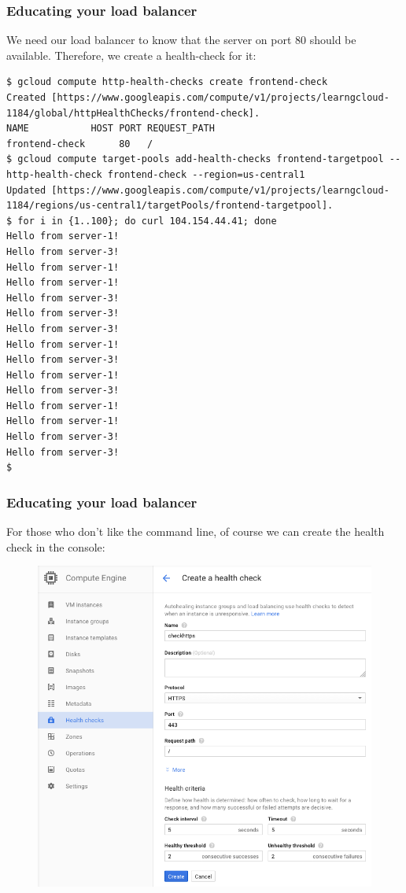 \documentclass[9pt]{beamer}
\begin{document}
\begin{frame}[fragile]
  \frametitle{Educating your load balancer}
  We need our load balancer to know that the server on port 80 should be available. Therefore, we create a health-check for it:
  \begin{verbatim}
$ gcloud compute http-health-checks create frontend-check
Created [https://www.googleapis.com/compute/v1/projects/learngcloud-1184/global/httpHealthChecks/frontend-check].
NAME           HOST PORT REQUEST_PATH
frontend-check      80   /
$ gcloud compute target-pools add-health-checks frontend-targetpool --http-health-check frontend-check --region=us-central1
Updated [https://www.googleapis.com/compute/v1/projects/learngcloud-1184/regions/us-central1/targetPools/frontend-targetpool].
$ for i in {1..100}; do curl 104.154.44.41; done
Hello from server-1!
Hello from server-3!
Hello from server-1!
Hello from server-1!
Hello from server-3!
Hello from server-3!
Hello from server-3!
Hello from server-1!
Hello from server-3!
Hello from server-1!
Hello from server-3!
Hello from server-1!
Hello from server-1!
Hello from server-3!
Hello from server-3!
$
  \end{verbatim}
\end{frame}

\begin{frame}[fragile]
  \frametitle{Educating your load balancer}
  For those who don't like the command line, of course we can create the health check in the console:
  \begin{figure}[fragile]
    \includegraphics[scale=0.3]{figures/HealthCheck.png}
  \end{figure}
\end{frame}
\end{document}
